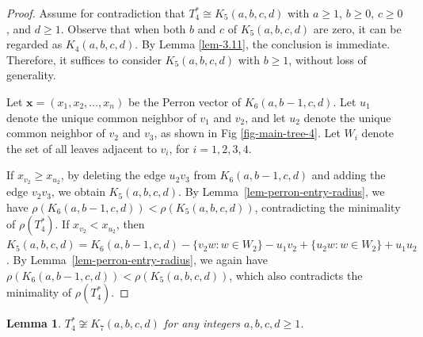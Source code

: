 \documentclass[12pt]{amsart}
\newtheorem{lem}{Lemma}[section]
\begin{document}
\begin{proof}
	Assume for contradiction that $T_4^* \cong K_5(a,b,c,d)$ with $a \ge 1$, $b \ge 0$, $c \ge 0$, and $d \ge 1$.
	Observe that when both $b$ and $c$ of $K_{5}(a,b,c,d)$ are zero, it can be regarded as $K_{4}(a,b,c,d)$.
	By Lemma \ref{lem-3.11}, the conclusion is immediate.
	Therefore, it suffices to consider $K_{5}(a,b,c,d)$ with $b \ge 1$, without loss of generality. 
	
	Let $\mathbf{x}=(x_1, x_2, \dots, x_n)$ be the Perron vector of $K_{6}(a,b-1,c,d)$. 
	Let $u_1$ denote the unique common neighbor of $v_1$ and $v_2$, and let $u_2$ denote the unique common neighbor of $v_2$ and $v_3$, as shown in Fig \ref{fig-main-tree-4}. Let $W_i$ denote the set of all leaves adjacent to $v_i$, for $i=1,2,3,4$.
	
If $x_{v_2} \ge x_{u_2}$, by deleting the edge $u_2v_3$ from $K_{6}(a,b-1,c,d)$ and adding the edge $v_2v_3$, we obtain $K_{5}(a,b,c,d)$. By Lemma~\ref{lem-perron-entry-radius}, we have $\rho(K_{6}(a,b-1,c,d)) < \rho(K_{5}(a,b,c,d))$, contradicting the minimality of $\rho(T_4^*)$.  If $x_{v_2} < x_{u_2}$, then $K_{5}(a,b,c,d)=K_{6}(a,b-1,c,d)-\{v_2w:w \in W_2\}-u_1v_2+\{u_2w:w \in W_2\}+u_1u_2$. By Lemma~\ref{lem-perron-entry-radius}, we again have $\rho(K_{6}(a,b-1,c,d)) < \rho(K_{5}(a,b,c,d))$, which also contradicts the minimality of $\rho(T_4^*)$.
\end{proof}


\begin{lem}\label{lem-3.13}
	$T_4^* \not\cong K_7(a,b,c,d)$ for any integers $a,b,c,d \ge 1$.
\end{lem}
\end{document}
